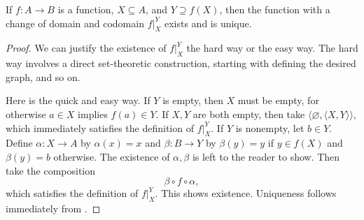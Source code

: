 \begin{prop}
	If $f:A\rightarrow B$ is a function, $X\subseteq A$, and $Y\supseteq f(X)$, then the function with a change of domain and codomain $f|_{X}^{Y}$ exists and is unique. 
\end{prop}
\begin{proof}
	We can justify the existence of $f|_{X}^{Y}$ the hard way or the easy way. 
	The hard way involves a direct set-theoretic construction, starting with defining the desired graph, and so on.
	
	Here is the quick and easy way. 
	If $Y$ is empty, then $X$ must be empty, for otherwise $a\in X$ implies $f(a)\in Y$. 
	If $X, Y$ are both empty, then take $\langle\varnothing, \langle X, Y\rangle\rangle$, which immediately satisfies the definition of $f|_{X}^{Y}$. 
	If $Y$ is nonempty, let $b\in Y$. 
	Define $\alpha:X\rightarrow A$ by $\alpha(x) = x$ and $\beta:B\rightarrow Y$ by $\beta(y) = y$ if $y\in f(X)$ and $\beta(y) = b$ otherwise.
	The existence of $\alpha, \beta$ is left to the reader to show.
	Then take the composition
	\[ \beta\circ f\circ\alpha, \]
	which satisfies the definition of $f|_{X}^{Y}$. 
	This shows existence. 
	Uniqueness follows immediately from .
\end{proof}




\fi 


